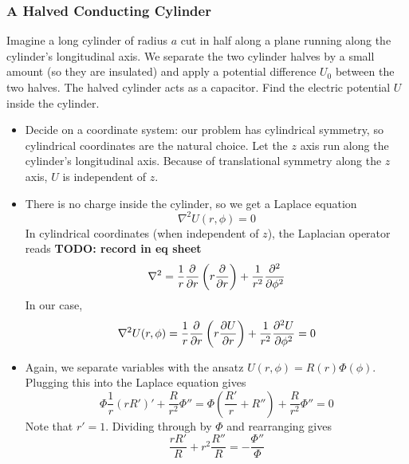 \documentclass[11pt, a4paper]{article}
\renewcommand{\laplacian}{\nabla^{2}}
\begin{document}
\subsubsection{A Halved Conducting Cylinder}
Imagine a long cylinder of radius $ a $ cut in half along a plane running along the cylinder's longitudinal axis. We separate the two cylinder halves by a small amount (so they are insulated) and apply a potential difference $ U_{0} $ between the two halves. The halved cylinder acts as a capacitor. Find the electric potential $ U $ inside the cylinder.

\begin{itemize}
	\item Decide on a coordinate system: our problem has cylindrical symmetry, so cylindrical coordinates are the natural choice. Let the $ z $ axis run along the cylinder's longitudinal axis. Because of translational symmetry along the $ z $ axis, $ U $ is independent of $ z $. 
	
	\item There is no charge inside the cylinder, so we get a Laplace equation
	\begin{equation*}
		\laplacian U(r, \phi) = 0
	\end{equation*}
	In cylindrical coordinates (when independent of $ z $), the Laplacian operator reads \textbf{TODO: record in eq sheet}
	\begin{equation*}
		\laplacian = \frac{1}{r}\pdv{r}\left(r \pdv{r}\right) + \frac{1}{r^{2}} \pdv[2]{}{\phi}
	\end{equation*}
	In our case,
	\begin{equation*}
		\laplacian U(r, \phi) = \frac{1}{r}\pdv{r}\left(r \pdv{U}{r}\right) + \frac{1}{r^{2}} \pdv[2]{U}{\phi} = 0
	\end{equation*}
	
	\item Again, we separate variables with the ansatz $ U(r, \phi) = R(r)\Phi(\phi) $. Plugging this into the Laplace equation gives
	\begin{equation*}
		\Phi \frac{1}{r}(rR')' + \frac{R}{r^{2}}\Phi'' = \Phi \left(\frac{R'}{r} + R''\right) + \frac{R}{r^{2}}\Phi'' = 0
	\end{equation*}
	Note that $ r'  = 1 $. Dividing through by $ \Phi $ and rearranging gives
	\begin{equation*}
		\frac{rR'}{R} + r^{2}\frac{R''}{R} = - \frac{\Phi''}{\Phi}
	\end{equation*}
	

\end{itemize}
\end{document}
